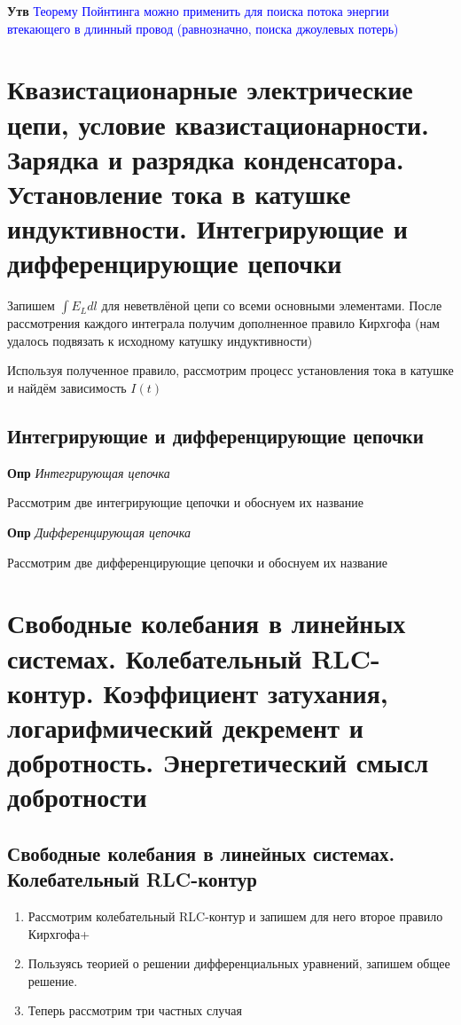 \documentclass[a4paper, 14pt]{article}
\begin{document}
    \textbf{Утв} \textcolor{blue}{Теорему Пойнтинга можно применить для поиска потока энергии втекающего в
    длинный провод (равнозначно, поиска джоулевых потерь)}
    
    \section{Квазистационарные электрические цепи, условие квазистационарности.
    Зарядка и разрядка конденсатора.
    Установление тока в катушке индуктивности.
    Интегрирующие и дифференцирующие цепочки}
    
    Запишем $\int E_L dl$ для неветвлёной цепи со всеми основными элементами.
    После рассмотрения каждого интеграла получим дополненное правило Кирхгофа (нам удалось подвязать к исходному
    катушку индуктивности)
    
    Используя полученное правило, рассмотрим процесс установления тока в катушке и найдём зависимость $I(t)$
    
    \subsection{Интегрирующие и дифференцирующие цепочки}
    
    \textbf{Опр} \textit{Интегрирующая цепочка}
    
    Рассмотрим две интегрирующие цепочки и обоснуем их название
    
    \textbf{Опр} \textit{Дифференцирующая цепочка}
    
    Рассмотрим две дифференцирующие цепочки и обоснуем их название
    
    \section{Свободные колебания в линейных системах. Колебательный RLC-контур.
    Коэффициент затухания, логарифмический декремент и добротность.
    Энергетический смысл добротности}
    
    \subsection{Свободные колебания в линейных системах. Колебательный RLC-контур}
    
    \begin{enumerate}
        \item Рассмотрим колебательный RLC-контур и запишем для него второе правило Кирхгофа+
        \item Пользуясь теорией о решении дифференциальных уравнений, запишем общее решение.
        \item Теперь рассмотрим три частных случая
    \end{enumerate}
    
\end{document}
